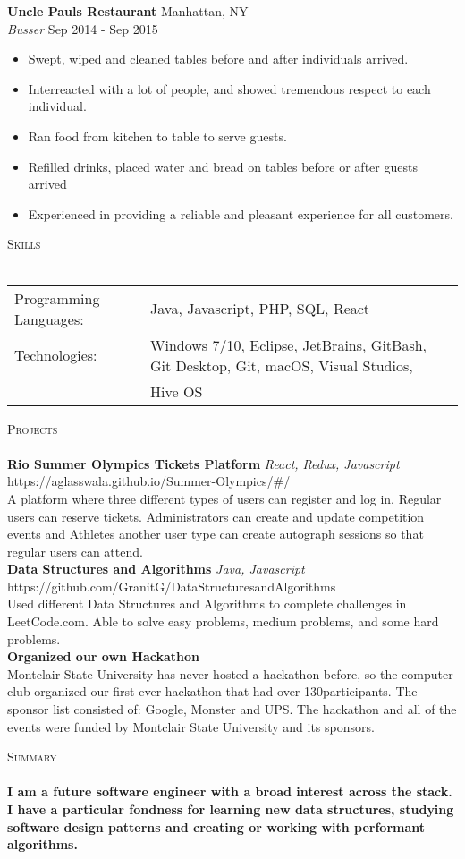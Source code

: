 \documentclass[a4paper]{article}
\newcommand{\lineunder} {
    \vspace*{-8pt} \\
    \hspace*{-18pt} \hrulefill \\
}
\newcommand{\header} [1] {
    {\hspace*{-18pt}\vspace*{6pt} \textsc{#1}}
    \vspace*{-6pt} \lineunder
}
\begin{document}
\textbf{Uncle Paul\textquotesingle{}s Restaurant} \hfill Manhattan, NY\\
\textit{Busser} \hfill Sep 2014 - Sep 2015\\
\vspace{-1mm}
\begin{itemize} \itemsep 1pt
	\item Swept, wiped and cleaned tables before and after individuals arrived.
	\item Interreacted with a lot of people, and showed tremendous respect to each individual.
	\item Ran food from kitchen to table to serve guests.
	\item Refilled drinks, placed water and bread on tables before or after guests arrived
 	\item Experienced in providing a reliable and pleasant experience for all customers.
\end{itemize}

\header{Skills}
\begin{tabular}{ l l }
	Programming Languages: & Java, Javascript, PHP, SQL, React                                                   \\
	Technologies:          & Windows 7/10, Eclipse, JetBrains, GitBash, Git Desktop, Git, macOS, Visual Studios, \\
				& Hive OS	\\
\end{tabular}
\vspace{2mm}

\header{Projects}
{\textbf{Rio Summer Olympics Tickets Platform}} {\sl React, Redux, Javascript} \hfill https://aglasswala.github.io/Summer-Olympics/\#/\\
A platform where three different types of users can register and log in. Regular users can reserve tickets. Administrators can create and update competition events and Athletes another user type can create autograph sessions so that regular users can attend.\\
\vspace*{2mm}
{\textbf{Data Structures and Algorithms}} {\sl Java, Javascript} \hfill https://github.com/GranitG/DataStructuresandAlgorithms\\
Used different Data Structures and Algorithms to complete challenges in LeetCode.com. Able to solve easy problems, medium problems, and some hard problems.\\
\vspace*{2mm}
{\textbf{Organized our own Hackathon}}\\
Montclair State University has never hosted a hackathon before, so the computer club organized our first ever hackathon that had over 130participants. The sponsor list consisted of: Google, Monster and UPS. The hackathon and all of the events were funded by Montclair State University and its sponsors.\\
\vspace*{2mm}

\header{Summary}
\textbf{I am a future software engineer with a broad interest across the stack. I have a particular fondness for learning new data structures, studying software design patterns and creating or working with performant algorithms.}\\

\vspace*{2mm}

\ 
\end{document}
